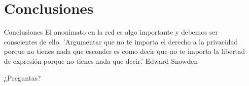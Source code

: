 \documentclass[10pt]{beamer}
\begin{document}
\section{Conclusiones}

\begin{frame}[fragile]{Conclusiones}
	\pause
	El anonimato en la red es algo importante y debemos ser conscientes de ello.
	\pause
	\newline
	'Argumentar que no te importa el derecho a la privacidad porque no tienes nada que esconder es como decir que no te importa la libertad de expresión porque no tienes nada que decir.'
	\newline
	Edward Snowden
\end{frame}

\begin{frame}[standout]
	¿Preguntas?
\end{frame}
	
\end{document}
